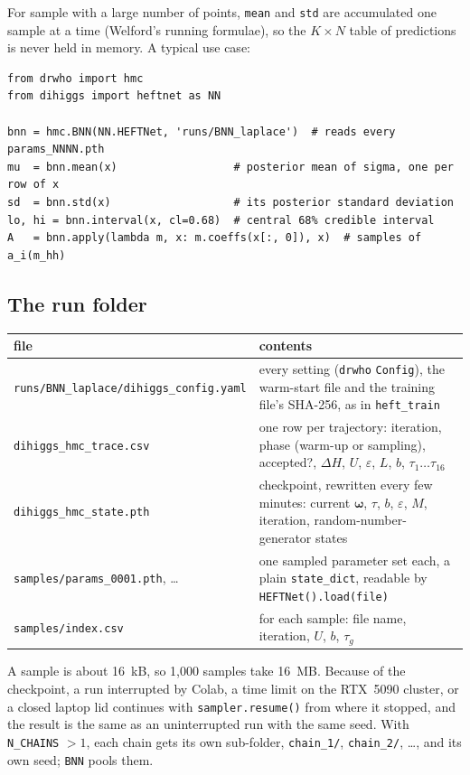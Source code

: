 \documentclass[11pt]{article}
\newcommand{\file}[1]{\nolinkurl{#1}}
\newcommand{\code}[1]{\texttt{#1}}
\newcommand{\bw}{\boldsymbol{\omega}}
\begin{document}
\noindent For sample with a large number of points, \code{mean} and
\code{std} are accumulated one sample at a time (Welford's running formulae), so the
$K \times N$ table of predictions is never held in memory. A typical use case:
\begin{lstlisting}
from drwho import hmc
from dihiggs import heftnet as NN

bnn = hmc.BNN(NN.HEFTNet, 'runs/BNN_laplace')  # reads every params_NNNN.pth
mu  = bnn.mean(x)                  # posterior mean of sigma, one per row of x
sd  = bnn.std(x)                   # its posterior standard deviation
lo, hi = bnn.interval(x, cl=0.68)  # central 68% credible interval
A   = bnn.apply(lambda m, x: m.coeffs(x[:, 0]), x)  # samples of a_i(m_hh)
\end{lstlisting}

\subsection{The run folder}
\label{sec:runfolder}

\begin{center}
\small
\begin{tabular}{p{}p{}}
\toprule
file & contents\\
\midrule
\file{runs/BNN_laplace/dihiggs_config.yaml} & every setting (\code{drwho} \code{Config}),
  the warm-start file and the training file's SHA-256, as in \file{heft_train}\\
\file{dihiggs_hmc_trace.csv} & one row per trajectory: iteration, phase (warm-up or
  sampling), accepted?, $\Delta H$, $U$, $\varepsilon$, $L$, $b$, $\tau_1 \ldots \tau_{16}$\\
\file{dihiggs_hmc_state.pth} & checkpoint, rewritten every few minutes: current $\bw$,
  $\tau$, $b$, $\varepsilon$, $M$, iteration, random-number-generator states\\
\file{samples/params_0001.pth}, \ldots & one sampled parameter set each, a plain
  \code{state\_dict}, readable by \code{HEFTNet().load(file)}\\
\file{samples/index.csv} & for each sample: file name, iteration, $U$, $b$, $\tau_g$\\
\bottomrule
\end{tabular}
\end{center}

\noindent A sample is about 16~kB, so 1,000 samples take 16~MB. Because of the
checkpoint, a run interrupted by Colab, a time limit on the RTX~5090 cluster, or a
closed laptop lid continues with \code{sampler.resume()} from where it stopped, and
the result is the same as an uninterrupted run with the same seed. With
\code{N\_CHAINS} $> 1$, each chain gets its own sub-folder, \file{chain_1/},
\file{chain_2/}, \ldots, and its own seed; \code{BNN} pools them.
\end{document}
